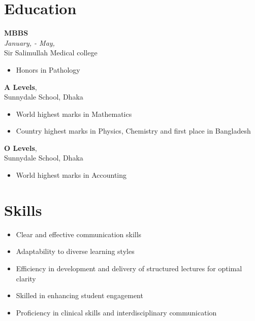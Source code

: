 \documentclass[a4paper,11pt]{article}
\newcommand{\resumeentry}[2]{
    \textbf{#1} \\
    \textit{#2}
}
\begin{document}
\begin{minipage}[t][12cm]{0.33\textwidth}
\raggedright

\section*{Education}
  \resumeentry{MBBS}{January, {} - May, {\numfont 2022}}\\ Sir Salimullah Medical college
  \begin{itemize}[left=0em, topsep=2pt, itemsep=0pt, parsep=0pt]
    \item Honors in Pathology
  \end{itemize} \vspace{2mm}
  \textbf{A Levels}, \textit{{}}\\ Sunnydale School, Dhaka
  \begin{itemize}[left=0em, topsep=2pt, itemsep=0pt, parsep=0pt]
    \item World highest marks in Mathematics
    \item Country highest marks in Physics, Chemistry and first place in Bangladesh
  \end{itemize} \vspace{2mm}
  \textbf{O Levels}, \textit{{}}\\ Sunnydale School, Dhaka \\
  \begin{itemize}[left=0em, topsep=0pt, itemsep=0pt, parsep=0pt]
    \item World highest marks in Accounting
  \end{itemize}
\section*{Skills}
\begin{itemize}[left=0em, itemsep=0pt, parsep=0pt]
  \item Clear and effective communication skills
  \item Adaptability to diverse learning styles  
  \item Efficiency in development and delivery of structured lectures for optimal clarity 
  \item Skilled in enhancing student engagement
  \item Proficiency in clinical skills and interdisciplinary communication
\end{itemize}


\end{minipage}
\end{document}
